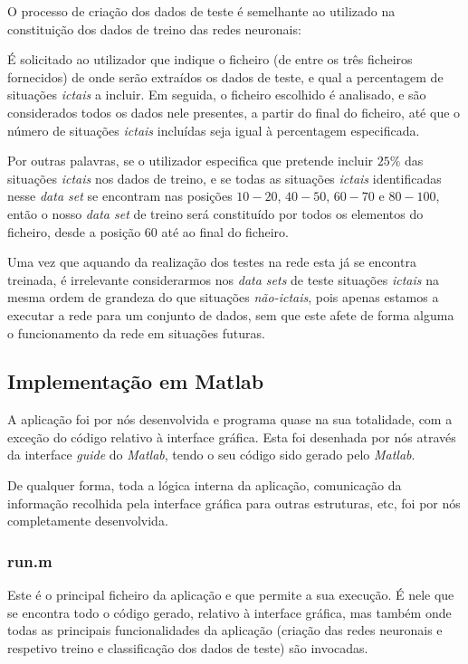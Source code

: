 \documentclass{article}
\begin{document}
O processo de criação dos dados de teste é semelhante ao utilizado na constituição dos dados de treino das redes neuronais:

É solicitado ao utilizador que indique o ficheiro (de entre os três ficheiros fornecidos) de onde serão extraídos os dados de teste, e qual a percentagem de situações \emph{ictais} a incluir. Em seguida, o ficheiro escolhido é analisado, e são considerados todos os dados nele presentes, a partir do final do ficheiro, até que o número de situações \emph{ictais} incluídas seja igual à percentagem especificada.

Por outras palavras, se o utilizador especifica que pretende incluir $25\%$ das situações \emph{ictais} nos dados de treino, e se todas as situações \emph{ictais} identificadas nesse \emph{data set} se encontram nas posições $10-20$, $40-50$, $60-70$ e $80-100$, então o nosso \emph{data set} de treino será constituído por todos os elementos do ficheiro, desde a posição $60$ até ao final do ficheiro.

Uma vez que aquando da realização dos testes na rede esta já se encontra treinada, é irrelevante considerarmos nos \emph{data sets} de teste situações \emph{ictais} na mesma ordem de grandeza do que situações \emph{não-ictais}, pois apenas estamos a executar a rede para um conjunto de dados, sem que este afete de forma alguma o funcionamento da rede em situações futuras.

\subsection{Implementação em Matlab}

A aplicação foi por nós desenvolvida e programa quase na sua totalidade, com a exceção do código relativo à interface gráfica. Esta foi desenhada por nós através da interface \emph{guide} do \emph{Matlab}, tendo o seu código sido gerado pelo \emph{Matlab}.

De qualquer forma, toda a lógica interna da aplicação, comunicação da informação recolhida pela interface gráfica para outras estruturas, etc, foi por nós completamente desenvolvida.

\subsubsection{run.m}

Este é o principal ficheiro da aplicação e que permite a sua execução. É nele que se encontra todo o código gerado, relativo à interface gráfica, mas também onde todas as principais funcionalidades da aplicação (criação das redes neuronais e respetivo treino e classificação dos dados de teste) são invocadas.
\end{document}
